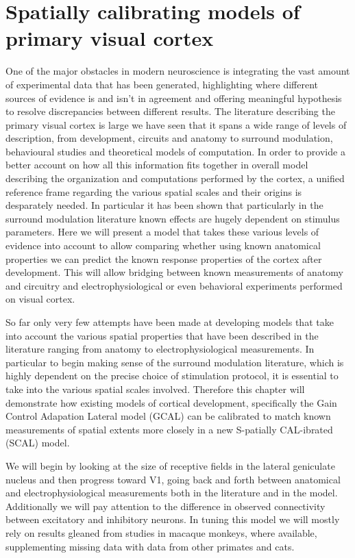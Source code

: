 \chapter{Spatially calibrating models of primary visual cortex}

One of the major obstacles in modern neuroscience is integrating the
vast amount of experimental data that has been generated, highlighting
where different sources of evidence is and isn't in agreement and
offering meaningful hypothesis to resolve discrepancies between
different results. The literature describing the primary visual cortex
is large we have seen that it spans a wide range of levels of
description, from development, circuits and anatomy to surround
modulation, behavioural studies and theoretical models of
computation. In order to provide a better account on how all this
information fits together in overall model describing the organization
and computations performed by the cortex, a unified reference frame
regarding the various spatial scales and their origins is desparately
needed. In particular it has been shown that particularly in the
surround modulation literature known effects are hugely dependent on
stimulus parameters. Here we will present a model that takes these
various levels of evidence into account to allow comparing whether
using known anatomical properties we can predict the known response
properties of the cortex after development. This will allow bridging
between known measurements of anatomy and circuitry and
electrophysiological or even behavioral experiments performed on
visual cortex.

So far only very few attempts have been made at developing models that
take into account the various spatial properties that have been
described in the literature ranging from anatomy to
electrophysiological measurements. In particular to begin making sense
of the surround modulation literature, which is highly dependent on
the precise choice of stimulation protocol, it is essential to take
into the various spatial scales involved. Therefore this chapter will
demonstrate how existing models of cortical development, specifically
the Gain Control Adapation Lateral model (GCAL) \citep{Stevens2013}
can be calibrated to match known measurements of spatial extents more
closely in a new S-patially CAL-ibrated (SCAL) model.

We will begin by looking at the size of receptive fields in the
lateral geniculate nucleus and then progress toward V1, going back and
forth between anatomical and electrophysiological measurements both in
the literature and in the model. Additionally we will pay attention to
the difference in observed connectivity between excitatory and
inhibitory neurons. In tuning this model we will mostly rely on
results gleaned from studies in macaque monkeys, where available,
supplementing missing data with data from other primates and cats.

